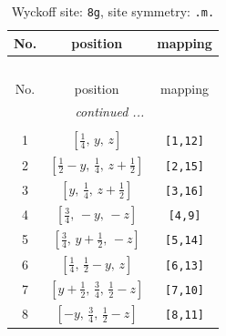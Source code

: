 \documentclass[fleqn,8pt]{jsarticle}
\begin{document}
\begin{longtable}{ccc}
\caption{Wyckoff site: {\tt 8g}, site symmetry: {\tt .m.}}
 \\
 \hline \hline
No. & position & mapping \\ \hline \endfirsthead

\multicolumn{2}{l}{\tablename\ \thetable{}} \\
 \hline \hline
No. & position & mapping \\ \hline \endhead

 \hline \hline
\multicolumn{2}{r}{\footnotesize\it continued ...} \\ \endfoot

 \hline \hline
\multicolumn{2}{r}{} \\ \endlastfoot

1 & $\left[ \frac{1}{4},\, y,\, z \right]$ & {\tt [1,12]} \\ \hline
2 & $\left[ \frac{1}{2} - y,\, \frac{1}{4},\, z + \frac{1}{2} \right]$ & {\tt [2,15]} \\ \hline
3 & $\left[ y,\, \frac{1}{4},\, z + \frac{1}{2} \right]$ & {\tt [3,16]} \\ \hline
4 & $\left[ \frac{3}{4},\, - y,\, - z \right]$ & {\tt [4,9]} \\ \hline
5 & $\left[ \frac{3}{4},\, y + \frac{1}{2},\, - z \right]$ & {\tt [5,14]} \\ \hline
6 & $\left[ \frac{1}{4},\, \frac{1}{2} - y,\, z \right]$ & {\tt [6,13]} \\ \hline
7 & $\left[ y + \frac{1}{2},\, \frac{3}{4},\, \frac{1}{2} - z \right]$ & {\tt [7,10]} \\ \hline
8 & $\left[ - y,\, \frac{3}{4},\, \frac{1}{2} - z \right]$ & {\tt [8,11]} \\
\end{longtable}
\renewcommand{\arraystretch}{1.2}
\end{document}
